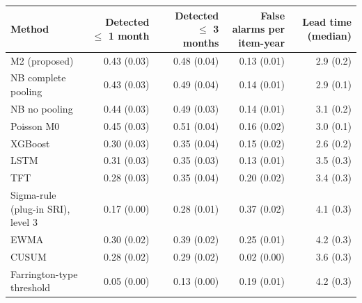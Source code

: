 \documentclass[10pt,a4paper]{article}
\begin{document}
\noindent\begin{minipage}{\linewidth}
\label{tab:S1-3}
\centering\footnotesize
\begin{tabular}{lrrrr}
\toprule
Method & Detected $\le$ 1 month & Detected $\le$ 3 months & False alarms per item-year & Lead time (median) \\ \midrule
M2 (proposed) & 0.43 (0.03) & 0.48 (0.04) & 0.13 (0.01) & 2.9 (0.2) \\
NB complete pooling & 0.43 (0.03) & 0.49 (0.04) & 0.14 (0.01) & 2.9 (0.1) \\
NB no pooling & 0.44 (0.03) & 0.49 (0.03) & 0.14 (0.01) & 3.1 (0.2) \\
Poisson M0 & 0.45 (0.03) & 0.51 (0.04) & 0.16 (0.02) & 3.0 (0.1) \\
XGBoost & 0.30 (0.03) & 0.35 (0.04) & 0.15 (0.02) & 2.6 (0.2) \\
LSTM & 0.31 (0.03) & 0.35 (0.03) & 0.13 (0.01) & 3.5 (0.3) \\
TFT & 0.28 (0.03) & 0.35 (0.04) & 0.20 (0.02) & 3.4 (0.3) \\
Sigma-rule (plug-in SRI), level 3 & 0.17 (0.00) & 0.28 (0.01) & 0.37 (0.02) & 4.1 (0.3) \\
EWMA & 0.30 (0.02) & 0.39 (0.02) & 0.25 (0.01) & 4.2 (0.3) \\
CUSUM & 0.28 (0.02) & 0.29 (0.02) & 0.02 (0.00) & 3.6 (0.3) \\
Farrington-type threshold & 0.05 (0.00) & 0.13 (0.00) & 0.19 (0.01) & 4.2 (0.3) \\
\bottomrule
\end{tabular}
\end{minipage}
\vspace{22pt}
\end{document}
